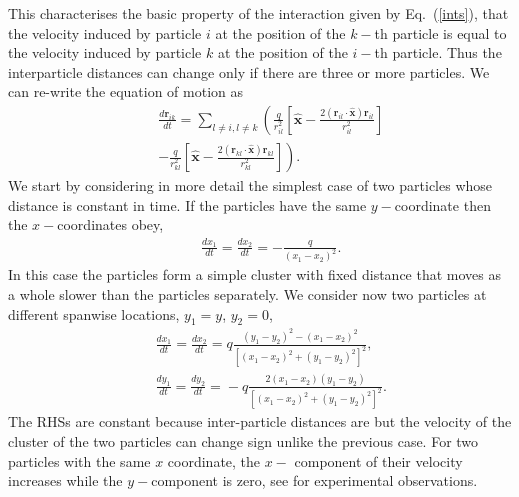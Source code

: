 This characterises the basic property of the interaction given by Eq.~(\ref{ints}), that the velocity induced by particle $i$ at the position of the $k-$th particle is equal to the velocity induced by particle $k$ at the position of the $i-$th particle. Thus the interparticle distances can change only if there are three or more particles. We can re-write the equation of motion as
\begin{eqnarray}&&\!\!\!\!\!\!\!\!\!\!\!\!\!\!\!\!
\frac{d\bm r_{ik}}{dt}=\sum_{l\neq i, l\neq k}\left(\frac{q}{r_{il}^2}\left[\bm {\hat x}\!-\!\frac{2 \left(\bm r_{il}\cdot\bm {\hat x}\right) \bm r_{il}}{r_{il}^2}\right]\right.\nonumber\\&&\!\!\!\!\!\!\!\!\!\!\!\!\!\!\!\!\left.-\frac{q}{r_{kl}^2}\left[\bm {\hat x}\!-\!\frac{2 \left(\bm r_{kl}\cdot\bm {\hat x}\right) \bm r_{kl}}{r_{kl}^2}\right]\right).
\end{eqnarray}
We start by considering in more detail the simplest case of two particles whose distance is constant in time. If the particles have the same $y-$coordinate then the $x-$coordinates obey,
\begin{eqnarray}&&\!\!\!\!\!\!\!\!\!\!\!\!\!\!\!\!
\frac{dx_1}{dt}=\frac{dx_2}{dt}=-\frac{q}{(x_1-x_2)^2}.
\end{eqnarray}
In this case the particles form a simple cluster with fixed distance that  moves as a whole slower than the particles separately. We consider now two particles at different spanwise locations, $y_1=y$, $y_2=0$,
\begin{eqnarray}&&\!\!\!\!\!\!\!\!\!\!\!\!\!\!\!\!
\frac{dx_1}{dt}=\frac{dx_2}{dt}=\!q\frac{(y_1-y_2)^2-(x_1-x_2)^2}{\left[(x_1-x_2)^2+(y_1-y_2)^2\right]^2},\nonumber\\&&\!\!\!\!\!\!\!\!\!\!\!\!\!\!\!\!\!
\frac{dy_1}{dt}=\frac{dy_2}{dt}\!=\!-q\frac{2(x_1-x_2)(y_1-y_2)}{\left[(x_1-x_2)^2+(y_1-y_2)^2\right]^2}.
\end{eqnarray}
The RHSs are constant because inter-particle distances are but the velocity of the cluster of the two particles can change sign unlike the previous case. For two particles with the same $x$ coordinate, the $x-$ component of their velocity increases while the $y-$component is zero, see \cite{tab0} for experimental observations.


